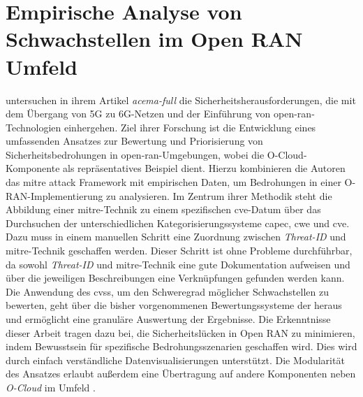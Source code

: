 \section{Empirische Analyse von Schwachstellen im Open RAN Umfeld}
\label{sec:forschungsstand-acema}
\citeauthor{klementSecuring6GTransition2024} untersuchen in ihrem Artikel \textit{\gls{acema-full}} die Sicherheitsherausforderungen, die mit dem Übergang von 5G zu 6G-Netzen und der Einführung von \gls{open-ran}-Technologien einhergehen. Ziel ihrer Forschung ist die Entwicklung eines umfassenden Ansatzes zur Bewertung und Priorisierung von Sicherheitsbedrohungen in \gls{open-ran}-Umgebungen, wobei die O-Cloud-Komponente als repräsentatives Beispiel dient. Hierzu kombinieren die Autoren das \gls{mitre} \gls{attack} Framework mit empirischen Daten, um Bedrohungen in einer O-RAN-Implementierung zu analysieren. Im Zentrum ihrer Methodik steht die Abbildung einer \gls{mitre}-Technik zu einem spezifischen \gls{cve}-Datum über das Durchsuchen der unterschiedlichen Kategorisierungssysteme \gls{capec}, \gls{cwe} und \gls{cve}. Dazu muss in einem manuellen Schritt eine Zuordnung zwischen \oran \textit{Threat-ID} und \gls{mitre}-Technik geschaffen werden. Dieser Schritt ist ohne Probleme durchführbar, da sowohl \textit{Threat-ID} und \gls{mitre}-Technik eine gute Dokumentation aufweisen und über die jeweiligen Beschreibungen eine Verknüpfungen gefunden werden kann. Die Anwendung des \gls{cvss}, um den Schweregrad möglicher Schwachstellen zu bewerten, geht über die bisher vorgenommenen Bewertungssysteme der \orana heraus und ermöglicht eine granuläre Auswertung der Ergebnisse. Die Erkenntnisse dieser Arbeit tragen dazu bei, die Sicherheitslücken in Open RAN zu minimieren, indem Bewusstsein für spezifische Bedrohungsszenarien geschaffen wird. Dies wird durch einfach verständliche Datenvisualisierungen unterstützt. Die Modularität des Ansatzes erlaubt außerdem eine Übertragung auf andere Komponenten neben \textit{O-Cloud} im \oran Umfeld \autocite{klementSecuring6GTransition2024}.

%

